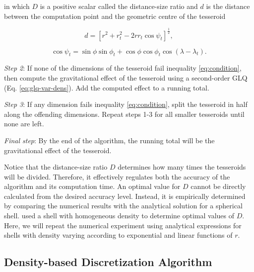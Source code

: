 \documentclass[extra, referee]{gji}
\begin{document}
\noindent
in which $D$ is a positive scalar called the distance-size ratio and $d$ is the distance
between the computation point and the geometric centre of the tesseroid

\begin{equation}
    d = \left[
        r^2 + r_t^2 - 2 r r_t \cos\psi_t
        \right]^{\frac{1}{2}} ,
    \label{eq:distance}
\end{equation}

\begin{equation}
    \cos\psi_t =
        \sin\phi\sin\phi_t + \cos\phi\cos\phi_t\cos(\lambda - \lambda_t) .
\end{equation}

\textit{Step 2}:
If none of the dimensions of the tesseroid fail inequality
\ref{eq:condition}, then compute the gravitational effect of the tesseroid using a
second-order GLQ (Eq. \ref{eq:glq-var-dens}).
Add the computed effect to a running total.

\textit{Step 3}:
If any dimension fails inequality \ref{eq:condition}, split the tesseroid in half along
the offending dimensions.
Repeat steps 1-3 for all smaller tesseroids until none are left.

\textit{Final step}:
By the end of the algorithm, the running total will be the gravitational effect of the
tesseroid.

Notice that the distance-size ratio $D$ determines how many
times the tesseroids will be divided.
Therefore, it effectively regulates both the accuracy of the algorithm and its
computation time.
An optimal value for $D$ cannot be directly calculated from the desired accuracy level.
Instead, it is empirically determined by comparing the numerical results with the
analytical solution for a spherical shell.
\citet{Uieda2016} used a shell with homogeneous density to determine optimal values of
$D$.
Here, we will repeat the numerical experiment using analytical expressions for shells
with density varying according to exponential and linear functions of $r$.


\subsection{Density-based Discretization Algorithm}
\end{document}
